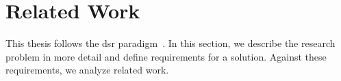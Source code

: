 \section{Related Work }
\label{sec:bpm2017background}
This thesis follows the \gls{dsr} paradigm~\citep{Peffers2008}. In this section, we describe the research problem in more detail and define requirements for a solution. Against these requirements, we analyze related work.

%



%
